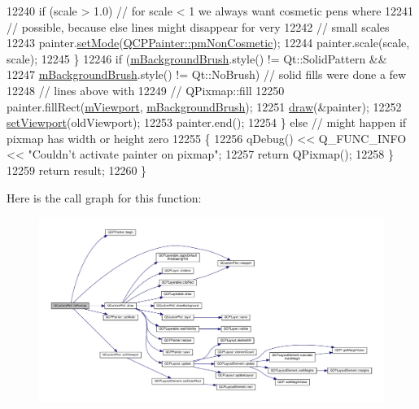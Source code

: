 \begin{DoxyCode}
12240       \textcolor{keywordflow}{if} (scale > 1.0) \textcolor{comment}{// for scale < 1 we always want cosmetic pens where}
12241                        \textcolor{comment}{// possible, because else lines might disappear for very}
12242                        \textcolor{comment}{// small scales}
12243         painter.\hyperlink{class_q_c_p_painter_af6b1f7d2bbc548b10aa55d8b6ad49577}{setMode}(\hyperlink{class_q_c_p_painter_a156cf16444ff5e0d81a73c615fdb156dac1e481bfaf408f2bd2eaad3ec341f36b}{QCPPainter::pmNonCosmetic});
12244       painter.scale(scale, scale);
12245     \}
12246     \textcolor{keywordflow}{if} (\hyperlink{class_q_custom_plot_a3aef5de4ac012178e3293248e9c63737}{mBackgroundBrush}.style() != Qt::SolidPattern &&
12247         \hyperlink{class_q_custom_plot_a3aef5de4ac012178e3293248e9c63737}{mBackgroundBrush}.style() != Qt::NoBrush) \textcolor{comment}{// solid fills were done a few}
12248                                                  \textcolor{comment}{// lines above with}
12249                                                  \textcolor{comment}{// QPixmap::fill}
12250       painter.fillRect(\hyperlink{class_q_custom_plot_ac0a7c38a715526c257cff95774f83ab6}{mViewport}, \hyperlink{class_q_custom_plot_a3aef5de4ac012178e3293248e9c63737}{mBackgroundBrush});
12251     \hyperlink{class_q_custom_plot_ad7a7d878bf050f101a43008e7d8fdb52}{draw}(&painter);
12252     \hyperlink{class_q_custom_plot_a3f9bc4b939dd8aaba9339fd09f273fc4}{setViewport}(oldViewport);
12253     painter.end();
12254   \} \textcolor{keywordflow}{else} \textcolor{comment}{// might happen if pixmap has width or height zero}
12255   \{
12256     qDebug() << Q\_FUNC\_INFO << \textcolor{stringliteral}{"Couldn't activate painter on pixmap"};
12257     \textcolor{keywordflow}{return} QPixmap();
12258   \}
12259   \textcolor{keywordflow}{return} result;
12260 \}
\end{DoxyCode}


Here is the call graph for this function\+:\nopagebreak
\begin{figure}[H]
\begin{center}
\leavevmode
\includegraphics[width=350pt]{class_q_custom_plot_aabb974d71ce96c137dc04eb6eab844fe_cgraph}
\end{center}
\end{figure}




